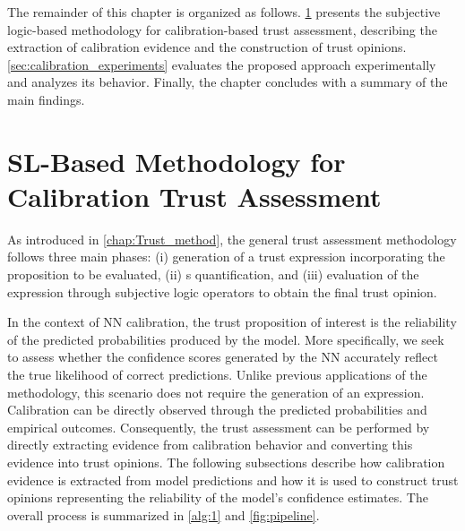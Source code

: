 The remainder of this chapter is organized as follows. \cref{sec:calibration_sl} presents the subjective logic-based methodology for calibration-based trust assessment, describing the extraction of calibration evidence and the construction of trust opinions. \cref{sec:calibration_experiments} evaluates the proposed approach experimentally and analyzes its behavior. Finally, the chapter concludes with a summary of the main findings.


\section{\acs{SL}-Based Methodology for Calibration Trust Assessment}
\label{sec:calibration_sl}
As introduced in \cref{chap:Trust_method}, the general trust assessment methodology follows three main phases: (i) generation of a trust expression incorporating the proposition to be evaluated, (ii) s quantification, and (iii) evaluation of the expression through subjective logic operators to obtain the final trust opinion.

In the context of \ac{NN} calibration, the trust proposition of interest is the reliability of the predicted probabilities produced by the model. More specifically, we seek to assess whether the confidence scores generated by the \ac{NN} accurately reflect the true likelihood of correct predictions. Unlike previous applications of the methodology, this scenario does not require the generation of an expression. Calibration can be directly observed through the predicted probabilities and empirical outcomes. Consequently, the trust assessment can be performed by directly extracting evidence from calibration behavior and converting this evidence into trust opinions. The following subsections describe how calibration evidence is extracted from model predictions and how it is used to construct trust opinions representing the reliability of the model's confidence estimates. The overall process is summarized in \cref{alg:1} and \cref{fig:pipeline}.


